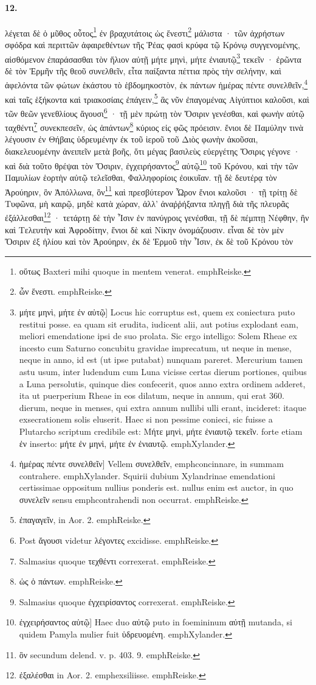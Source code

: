 \documentclass[a4paper, 11pt, oneside, polutonikogreek, german]{article}
\begin{document}
\paragraph{12.}
λέγεται δὲ ὁ μῦθος οὗτος\footnote{οὕτως Baxteri mihi quoque in mentem venerat. emph{Reiske.}} ἐν βραχυτάτοις ὡς ἔνεστι\footnote{ὧν ἔνεστι. emph{Reiske.}} μάλιστα · τῶν ἀχρήστων σφόδρα καὶ περιττῶν ἀφαιρεθέντων τῆς Ῥέας φασὶ κρύφα τῷ Κρόνῳ συγγενομένης, αἰσθόμενον ἐπαράσασθαι τὸν ἥλιον αὐτῇ μήτε μηνὶ, μήτε ἐνιαυτῷ\footnote{μήτε μηνὶ, μήτε ἐν αὐτῷ] Locus hic corruptus est, quem ex coniectura puto restitui posse. ea quam sit erudita, iudicent alii, aut potius explodant eam, meliori emendatione ipsi de suo prolata. Sic ergo intelligo: Solem Rheae ex incesto cum Saturno concubitu gravidae imprecatum, ut neque in mense, neque in anno, id est (ut ipse putabat) nunquam pareret. Mercurium tamen astu usum, inter ludendum cum Luna vicisse certas dierum portiones, quibus a Luna persolutis, quinque dies confecerit, quos anno extra ordinem adderet, ita ut puerperium Rheae in eos dilatum, neque in annum, qui erat 360. dierum, neque in menses, qui extra annum nullibi ulli erant, incideret: itaque exsecrationem solis eluserit. Haec si non pessime conieci, sic fuisse a Plutarcho scriptum credibile est: Μήτε μηνὶ, μήτε ἐνιαυτῷ τεκεῖν. forte etiam ἐν inserto: μήτε ἐν μηνὶ, μήτε ἐν ἐνιαυτῷ. emph{Xylander.}} τεκεῖν · ἐρῶντα δὲ τὸν Ἑρμῆν τῆς θεοῦ συνελθεῖν, εἶτα παίξαντα πέττια πρὸς τὴν σελήνην, καὶ ἀφελόντα τῶν φώτων ἑκάστου τὸ ἑβδομηκοστὸν, ἐκ πάντων ἡμέρας πέντε συνελθεῖν,\footnote{ἡμέρας πέντε συνελθεῖν] Vellem συνελθεῖν, emph{concinnare, in summam contrahere.} emph{Xylander.} Squirii dubium Xylandrinae emendationi certissimae oppositum nullius ponderis est. nullus enim est auctor, in quo συνελεῖν sensu emph{contrahendi} non occurrat. emph{Reiske.}} καὶ ταῖς ἑξήκοντα καὶ τριακοσίαις ἐπάγειν,\footnote{ἐπαγαγεῖν, in Aor. 2. emph{Reiske.}} ἃς νῦν ἐπαγομένας Αἰγύπτιοι καλοῦσι, καὶ τῶν θεῶν γενεθλίους ἄγουσι\footnote{Post ἄγουσι videtur λέγοντες excidisse. emph{Reiske.}} · τῇ μὲν πρώτῃ τὸν Ὄσιριν γενέσθαι, καὶ φωνὴν αὐτῷ ταχθέντι\footnote{Salmasius quoque τεχθέντι correxerat. emph{Reiske.}} συνεκπεσεῖν, ὡς ἁπάντων\footnote{ὡς ὁ πάντων. emph{Reiske.}} κύριος εἰς φῶς πρόεισιν. ἔνιοι δὲ Παμύλην τινὰ λέγουσιν ἐν Θήβαις ὑδρευμένην ἐκ τοῦ ἱεροῦ τοῦ Διὸς φωνὴν ἀκοῦσαι, διακελευομένην ἀνειπεῖν μετὰ βοῆς, ὅτι μέγας βασιλεὺς εὐεργέτης Ὄσιρις γέγονε · καὶ διὰ τοῦτο θρέψαι τὸν Ὄσιριν, ἐγχειρήσαντος\footnote{Salmasius quoque ἐγχειρίσαντος correxerat. emph{Reiske.}} αὐτῷ\footnote{ἐγχειρήσαντος αὐτῷ] Haec duo αὐτῷ puto in foemininum αὐτῇ mutanda, si quidem Pamyla mulier fuit ὑδρευομένη. emph{Xylander.}} τοῦ Κρόνου, καὶ τὴν τῶν Παμυλίων ἑορτὴν αὐτῷ τελεῖσθαι, Φαλληφορίοις ἐοικυῖαν. τῇ δὲ δευτέρᾳ τὸν Ἀρούηριν, ὃν Ἀπόλλωνα, ὃν\footnote{ὃν secundum delend. v. p. 403. 9. emph{Reiske.}} καὶ πρεσβύτερον Ὧρον ἔνιοι καλοῦσι · τῇ τρίτῃ δὲ Τυφῶνα, μὴ καιρῷ, μηδὲ κατὰ χώραν, ἀλλ' ἀναῤῥήξαντα πληγῇ διὰ τῆς πλευρᾶς ἐξάλλεσθαι\footnote{ἐξαλέσθαι in Aor. 2. emph{exsiliisse.} emph{Reiske.}} · τετάρτῃ δὲ τὴν Ἶσιν ἐν πανύγροις γενέσθαι, τῇ δὲ πέμπτῃ Νέφθην, ἣν καὶ Τελευτὴν καὶ Ἀφροδίτην, ἔνιοι δὲ καὶ Νίκην ὀνομάζουσιν. εἶναι δὲ τὸν μὲν Ὄσιριν ἐξ ἡλίου καὶ τὸν Ἀρούηριν, ἐκ δὲ Ἑρμοῦ τὴν Ἶσιν, ἐκ δὲ τοῦ Κρόνου τὸν 
\end{document}
